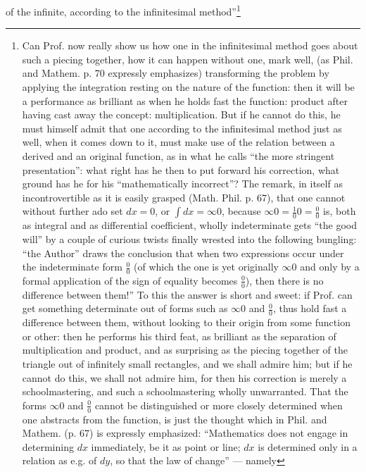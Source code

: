 \documentclass[12pt,a4paper,openany]{book}
\begin{document}
of the infinite, according to the infinitesimal method''\footnote{Can Prof. now really show us how one in the infinitesimal method goes about such a piecing together, how
it can happen without one, mark well, (as Phil. and Mathem.
p. 70 expressly emphasizes) transforming the problem by
applying the integration resting on the nature of the function: %
then it will be a performance as brilliant as when he holds fast the function: product after having cast away the concept: multiplication. But if he cannot do this, he must himself admit that one
according to the infinitesimal method just as well, when it comes down to it, must make use of the relation between a derived and an original
function, as in what he calls ``the more stringent presentation'': what right has he then to put forward his correction, what
ground has he for his ``mathematically incorrect''? The remark, in itself as incontrovertible as it is easily grasped (Math. Phil.
p. 67), that one cannot without further ado set $dx = 0$, or
$\int dx = \infty 0$, because $\infty 0 = \frac{1}{0} 0 = \frac{0}{0}$ is, both as integral and
as differential coefficient, wholly indeterminate gets ``the good will''
by a couple of curious twists finally wrested into the following bungling: ``the Author'' draws the conclusion that when two expressions
occur under the indeterminate form $\frac{0}{0}$ (of which the one is yet
originally $\infty 0$ and only by a formal application of
the sign of equality becomes $\frac{0}{0}$), then there is no difference
between them!'' To this the answer is short and sweet: if Prof.
can get something determinate out of forms such as $\infty 0$ and $\frac{0}{0}$, thus hold fast a difference between them, without looking to their origin from some function or other: then he performs his third feat, as brilliant as the separation of multiplication and
product, and as surprising as the piecing together of the triangle
out of infinitely small rectangles, and we shall admire him; but if
he cannot do this, we shall not admire him, for then his correction
is merely a schoolmastering, and such a schoolmastering wholly unwarranted.
That the forms $\infty 0$ and $\frac{0}{0}$ cannot be distinguished or more closely
determined when one abstracts from the function, is just the thought
which in Phil. and Mathem. (p. 67) is expressly emphasized:
``Mathematics does not engage in determining $dx$ immediately, be it as point or line; $dx$ is determined only in a
relation as e.g. of $dy$, so that the law of change'' --- namely
}
\end{document}
